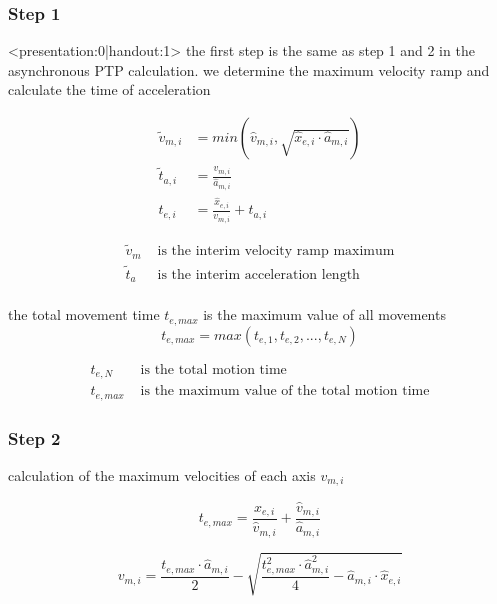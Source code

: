 \documentclass[%
  professionalfonts,%
  xcolor={%
    usenames,%
    dvipsnames,%
    svgnames,%
    table,%
    hyperref%
  }%
]{beamer}
\begin{document}
\subsubsection{Step 1}
\begin{frame}<presentation:0|handout:1>
the first step is the same as step 1 and 2 in the asynchronous PTP calculation. we determine the maximum velocity ramp and  calculate the time of acceleration
\end{frame}

\begin{frame}
\begin{align*}
\tilde{v}_{m,i} & = min(\hat{v}_{m,i},\sqrt{\hat{x}_{e,i} \cdot \hat{a}_{m,i}}) \\
\tilde{t}_{a,i} & = \frac{v_{m,i}}{\hat{a}_{m,i}}\\
t_{e,i} & = \frac{\hat{x}_{e,i}}{v_{m,i}} + t_{a,i}
\end{align*}

\begin{align*}
\tilde{v}_{m} & \text{ is the interim velocity ramp maximum}\\
\tilde{t}_{a} & \text{ is the interim acceleration length}\\
\end{align*}                 
\end{frame}

\begin{frame}
the total movement time $t_{e,max}$ is the maximum value of all movements
\begin{equation*}
t_{e,max} = max(t_{e,1},t_{e,2},...,t_{e,N})
\end{equation*}

\begin{align*}
t_{e,N} & \text{ is the total motion time } \\
t_{e,max} & \text{ is the maximum value of the total motion time}      
\end{align*}
\end{frame}
  
\subsubsection{Step 2}
\begin{frame}
calculation of the maximum velocities of each axis $v_{m,i}$

\begin{equation*}
t_{e,max} = \frac{\hat{x}_{e,i}}{\hat{v}_{m,i}}+\frac{\hat{v}_{m,i}}{\hat{a}_{m,i}}
\end{equation*}


\begin{equation*}
v_{m,i} = \frac{t_{e,max} \cdot \hat{a}_{m,i}}{2}-\sqrt{\frac{t_{e,max}^2 \cdot \hat{a}_{m,i}^2}{4}-\hat{a}_{m,i}\cdot \hat{x}_{e,i}}
\end{equation*}
\end{frame}
  
\end{document}
